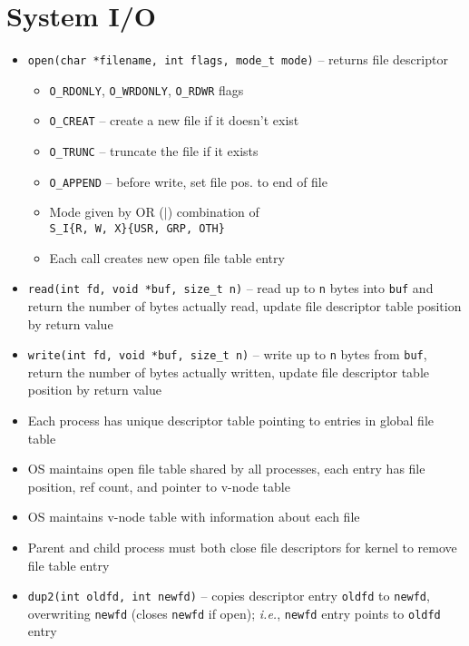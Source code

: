 \documentclass[twocolumn]{article}
\renewcommand{\tt}[1]{\texttt{#1}}
\begin{document}
\section{System I/O}
\begin{itemize}[noitemsep]
    \item \tt{open(char *filename, int flags, mode\_t mode)} -- returns file descriptor
    \begin{itemize}[noitemsep]
        \item \tt{O\_RDONLY}, \tt{O\_WRDONLY}, \tt{O\_RDWR} flags
        \item \tt{O\_CREAT} -- create a new file if it doesn't exist
        \item \tt{O\_TRUNC} -- truncate the file if it exists
        \item \tt{O\_APPEND} -- before write, set file pos. to end of file
        \item Mode given by OR ($|$) combination of \\ \tt{S\_I\{R, W, X\}\{USR, GRP, OTH\}}
        \item Each call creates new open file table entry
    \end{itemize}
    \item \tt{read(int fd, void *buf, size\_t n)} -- read up to \tt{n} bytes into \tt{buf} and return the number of bytes actually read, update file descriptor table position by return value
    \item \tt{write(int fd, void *buf, size\_t n)} -- write up to \tt{n} bytes from \tt{buf}, return the number of bytes actually written, update file descriptor table position by return value
    \item Each process has unique descriptor table pointing to entries in global file table
    \item OS maintains open file table shared by all processes, each entry has file position, ref count, and pointer to v-node table
    \item OS maintains v-node table with information about each file
    \item Parent and child process must both close file descriptors for kernel to remove file table entry
    \item \tt{dup2(int oldfd, int newfd)} -- copies descriptor entry \tt{oldfd} to \tt{newfd}, overwriting \tt{newfd} (closes \tt{newfd} if open); \textit{i.e.}, \tt{newfd} entry points to \tt{oldfd} entry
\end{itemize}
\end{document}
